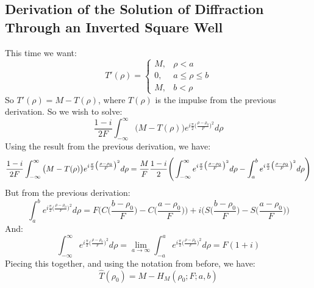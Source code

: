 \documentclass{article}
\theoremstyle{mystyle}
\begin{document}
\subsection{Derivation of the Solution of Diffraction Through an Inverted Square Well}
This time we want:
\begin{equation*}
    T'(\rho) = \begin{cases} M, & \rho<a \\ 0, & a\leq \rho \leq b \\ M, & b<\rho\end{cases}    
\end{equation*}
So $T'(\rho) = M - T(\rho)$, where $T(\rho)$ is the impulse from the previous derivation. So we wish to solve:
\begin{equation*}
\frac{1-i}{2F}\int_{-\infty}^{\infty}\big(M-T(\rho)\big)e^{i\frac{\pi}{2}\big(\frac{\rho-\rho_0}{F}\big)^2}d\rho
\end{equation*}
Using the result from the previous derivation, we have:
\begin{equation*}
\frac{1-i}{2F}\int_{-\infty}^{\infty}\big(M-T(\rho)\big)e^{i\frac{\pi}{2}\big(\frac{\rho-\rho_0}{F}\big)^2}d\rho = \frac{M}{F}\frac{1-i}{2}\Bigg(\int_{-\infty}^{\infty}e^{i\frac{\pi}{2}\big(\frac{\rho-\rho_0}{F}\big)^2}d\rho - \int_{a}^{b}e^{i\frac{\pi}{2}\big(\frac{\rho-\rho_0}{F}\big)^2}d\rho\Bigg)\\
\end{equation*}
But from the previous derivation:
\begin{equation*}
    \int_{a}^{b}e^{i\frac{\pi}{2}\big(\frac{\rho-\rho_0}{F}\big)^{2}}d\rho = F\bigg(C\big(\frac{b-\rho_0}{F}\big)-C\big(\frac{a-\rho_0}{F}\big)\bigg)+i\bigg(S\big(\frac{b-\rho_0}{F}\big)-S\big(\frac{a-\rho_0}{F}\big)\bigg)
\end{equation*}
And:
\begin{equation*}
    \int_{-\infty}^{\infty}e^{i\frac{\pi}{2}\big(\frac{\rho-\rho_0}{F}\big)^{2}}d\rho = \underset{a\rightarrow \infty}{\lim} \int_{-a}^{a}e^{i\frac{\pi}{2}\big(\frac{\rho-\rho_0}{F}\big)^{2}}d\rho = F(1+i)
\end{equation*}
Piecing this together, and using the notation from before, we have:
\begin{equation*}
\hat{T}(\rho_0) = M-H_{M}(\rho_0;F;a,b)
\end{equation*}
\end{document}
